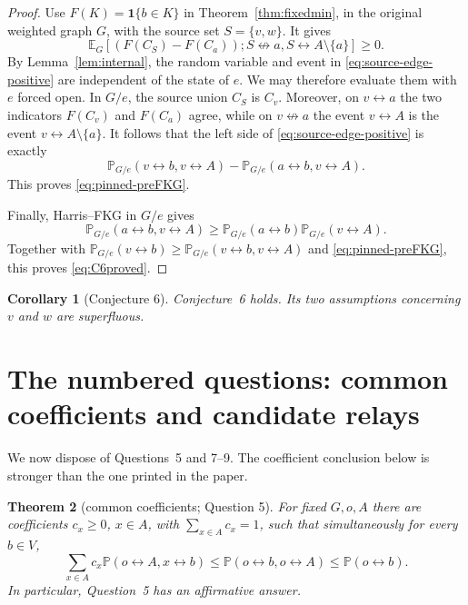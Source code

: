 \documentclass[11pt]{article}
\newtheorem{theorem}{Theorem}[section]
\newtheorem{corollary}[theorem]{Corollary}
\theoremstyle{definition}
\theoremstyle{remark}
\newcommand{\PP}{\mathbb P}
\newcommand{\EE}{\mathbb E}
\newcommand{\one}{\mathbf 1}
\newcommand{\con}{\leftrightarrow}
\newcommand{\ncon}{\not\leftrightarrow}
\begin{document}
\begin{proof}
Use $F(K)=\one\{b\in K\}$ in Theorem~\ref{thm:fixedmin}, in the original
weighted graph $G$, with the source set $S=\{v,w\}$.  It gives
\begin{equation}\label{eq:source-edge-positive}
 \EE_G[(F(C_S)-F(C_a));S\ncon a,S\con A\setminus\{a\}]
 \geq0.
\end{equation}
By Lemma~\ref{lem:internal}, the random variable and event in
\eqref{eq:source-edge-positive} are independent of the state of $e$.
We may therefore evaluate them with $e$ forced open.  In $G/e$, the
source union $C_S$ is $C_v$.  Moreover, on $v\con a$ the two indicators
$F(C_v)$ and $F(C_a)$ agree, while on $v\ncon a$ the event $v\con A$ is
the event $v\con A\setminus\{a\}$.  It follows that the left side of
\eqref{eq:source-edge-positive} is exactly
\[
 \PP_{G/e}(v\con b,v\con A)
 -\PP_{G/e}(a\con b,v\con A).
\]
This proves \eqref{eq:pinned-preFKG}.

Finally, Harris--FKG in $G/e$ gives
\[
 \PP_{G/e}(a\con b,v\con A)
 \geq\PP_{G/e}(a\con b)\PP_{G/e}(v\con A).
\]
Together with
$\PP_{G/e}(v\con b)\geq\PP_{G/e}(v\con b,v\con A)$ and
\eqref{eq:pinned-preFKG}, this proves \eqref{eq:C6proved}.
\end{proof}

\begin{corollary}[Conjecture 6]\label{cor:C6}
Conjecture~6 holds.  Its two assumptions concerning $v$ and $w$ are
superfluous.
\end{corollary}

\section{The numbered questions: common coefficients and candidate relays}
\label{sec:questions}

We now dispose of Questions~5 and 7--9.  The coefficient conclusion below
is stronger than the one printed in the paper.

\begin{theorem}[common coefficients; Question 5]\label{thm:Q5}
For fixed $G,o,A$ there are coefficients $c_x\geq0$, $x\in A$, with
$\sum_{x\in A}c_x=1$, such that simultaneously for every $b\in V$,
\begin{equation}\label{eq:Q5strong}
 \sum_{x\in A}c_x\PP(o\con A,x\con b)
 \leq \PP(o\con b,o\con A)
 \leq \PP(o\con b).
\end{equation}
In particular, Question~5 has an affirmative answer.
\end{theorem}
\end{document}
